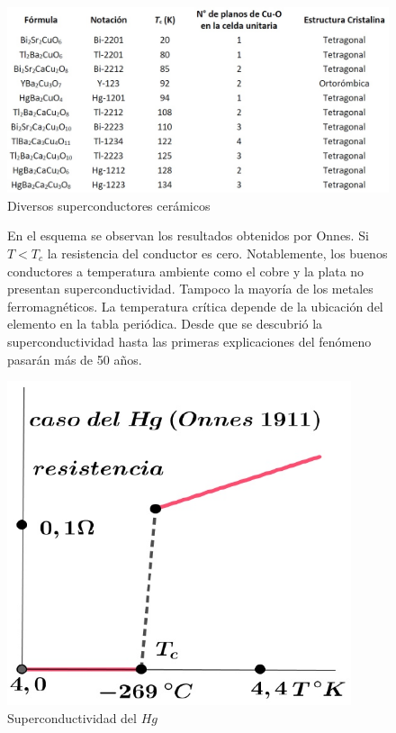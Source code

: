 \begin{figure}[H]
    \centering
    \includegraphics[width=1.0\textwidth]{./Figures/fig48}
	\caption{Diversos superconductores cerámicos}
	\label{fig:48}
\end{figure}



\begin{figure}[H]
  \begin{minipage}[b]{0.47\textwidth}
En el esquema se observan los resultados obtenidos por Onnes. Si $T<T_{c}$ la resistencia del conductor es cero. Notablemente, los buenos conductores a temperatura ambiente como el cobre y la plata no presentan superconductividad. Tampoco la mayoría de los metales ferromagnéticos. La temperatura crítica depende de la ubicación del elemento en la tabla periódica. Desde que se descubrió la superconductividad hasta las primeras explicaciones del fenómeno pasarán más de 50 años.
  \vspace{0.0cm}
  \end{minipage}
  \hfill
  \begin{minipage}[b]{0.47\textwidth}
     \includegraphics[width=0.9\textwidth]{./Figures/fig44}
     \caption{Superconductividad del $Hg$}
	\label{fig:44}
	  \vspace{0.0cm}
  \end{minipage}
\end{figure}


